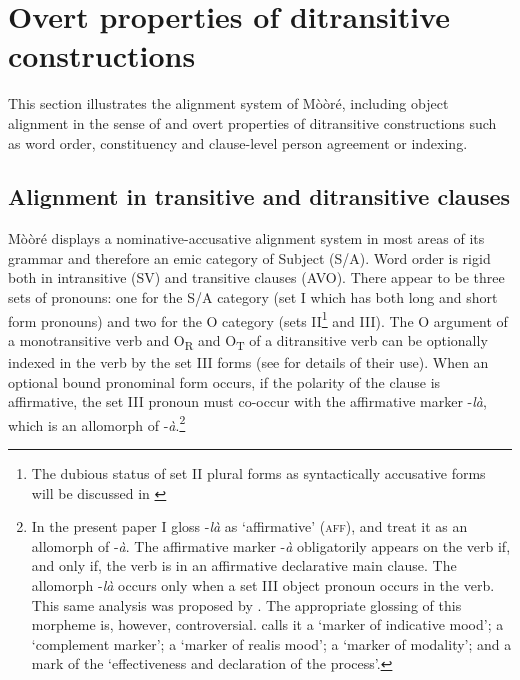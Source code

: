 \documentclass[output=paper]{langsci/langscibook}
\begin{document}
\section{Overt properties of ditransitive constructions}\label{§4:overt.pacchiarotti}

This section illustrates the alignment system of M\`{o}\`{o}r\'{e}, including object alignment in the sense of \citet{malchukovetal2010} and overt properties of ditransitive constructions such as word order, constituency and clause-level person agreement or indexing.

\subsection{Alignment in transitive and ditransitive clauses}\label{§4.1:alignment.pacchiarotti}

M\`{o}\`{o}r\'{e} displays a nominative-accusative alignment system in most areas of its grammar and therefore an emic category of Subject (S/A). Word order is rigid both in intransitive (SV) and transitive clauses (AVO). There appear to be three sets of pronouns: one for the S/A category (set I which has both long and short form pronouns) and two for the O category (sets II\footnote{The dubious status of set II plural forms as syntactically accusative forms will be discussed in \label{§4.3:split.pacchiarotti}} and III). The O argument of a monotransitive verb and O\textsubscript{R} and O\textsubscript{T} of a ditransitive verb can be optionally indexed in the verb by the set III forms (see  for details of their use). When an optional bound pronominal form occurs, if the polarity of the clause is affirmative, the set III pronoun must co-occur with the affirmative marker -\textit{l\`{a}}, which is an allomorph of -\textit{\`{a}}.\footnote{In the present paper I gloss -\textit{l\`{a}} as `affirmative' (\textsc{aff}), and treat it as an allomorph of -\textit{\`{a}}. The affirmative marker -\textit{\`{a}} obligatorily appears on the verb if, and only if, the verb is in an affirmative declarative main clause. The allomorph -\textit{l\`{a}} occurs only when a set III object pronoun occurs in the verb. This same analysis was proposed by \citet{manessy1963}. The appropriate glossing of this morpheme is, however, controversial. \citet[96]{alexandre1953} calls it a `marker of indicative mood'; \citet[112]{peterson1971} a `complement marker'; \citet{canu1976} a `marker of realis mood'; \citet{Kabore1985} a `marker of modality'; and \citet{nikiema2003} a mark of the `effectiveness and declaration of the process'.} 
\end{document}
